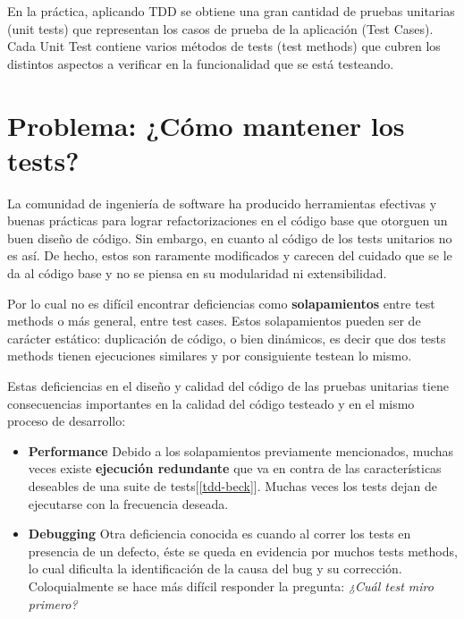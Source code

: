 \par En la práctica, aplicando TDD se obtiene una gran cantidad de pruebas unitarias (unit tests) que representan los casos de prueba de la aplicación (Test Cases). Cada Unit Test contiene varios métodos de tests (test methods) que cubren los distintos aspectos a verificar en la funcionalidad que se está testeando.


\section{Problema: ¿Cómo mantener los tests?}

\par La comunidad de ingeniería de software ha producido herramientas efectivas y buenas prácticas para lograr refactorizaciones en el código base que otorguen un buen diseño de código. Sin embargo, en cuanto al código de los tests unitarios no es así. De hecho, estos son raramente modificados y carecen del cuidado que se le da al código base y no se piensa en su modularidad ni extensibilidad. 


\par Por lo cual no es difícil encontrar deficiencias como \textbf{solapamientos} entre test methods o más general, entre test cases. Estos solapamientos pueden ser de carácter estático: duplicación de código, o bien dinámicos, es decir que dos tests methods tienen ejecuciones similares y por consiguiente testean lo mismo. 
\par Estas deficiencias en el diseño y calidad del código de las pruebas unitarias tiene consecuencias importantes en la calidad del código testeado y en el mismo proceso de desarrollo:
\begin{itemize}
\item \textbf{Performance} Debido a los solapamientos previamente mencionados, muchas veces existe \textbf{ejecución redundante} que va en contra de las características deseables de una suite de tests[\ref{tdd-beck}]. Muchas veces los tests dejan de ejecutarse con la frecuencia deseada.
\item \textbf{Debugging} Otra deficiencia conocida es cuando al correr los tests en presencia de un defecto, éste se queda en evidencia por muchos tests methods, lo cual dificulta la identificación de la causa del bug y su corrección. Coloquialmente se hace más difícil responder la pregunta: \emph{¿Cuál test miro primero?}
\end{itemize}
 
